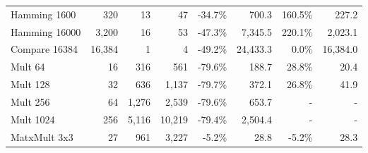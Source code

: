 \begin{table}
{\begin{tabular}{l||rrr||rr||rr}
Hamming 1600              & 320                   & 13                          & 47                               & -34.7\%                                  & 700.3                                    & 160.5\%                                       & 227.2                                         \\
Hamming 16000             & 3,200                 & 16                          & 53                               & -47.3\%                                  & 7,345.5                                  & 220.1\%                                       & 2,023.1                                       \\ \hline
Compare 16384             & 16,384                & 1                           & 4                                & -49.2\%                                  & 24,433.3                                 & 0.0\%                                         & 16,384.0                                      \\ \hline
Mult 64                   & 16                    & 316                         & 561                              & -79.6\%                                  & 188.7                                    & 28.8\%                                        & 20.4                                          \\
Mult 128                  & 32                    & 636                         & 1,137                            & -79.7\%                                  & 372.1                                    & 26.8\%                                        & 41.9                                          \\
Mult 256                  & 64                    & 1,276                       & 2,539                            & -79.6\%                                  & 653.7                                    & -                                             & -                                             \\
Mult 1024                 & 256                   & 5,116                       & 10,219                           & -79.4\%                                  & 2,504.4                                  & -                                             & -                                             \\ \hline
MatxMult 3x3              & 27                    & 961                         & 3,227                            & -5.2\%                                   & 28.8                                     & -5.2\%                                        & 28.3                                          \\

\end{tabular}}
\end{table}
